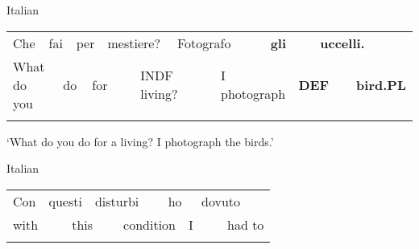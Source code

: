 \begin{listWWNumileveli}
\item 

\begin{styleExample}
Italian

\end{styleExample}

\end{listWWNumileveli}

\begin{tabular}{llllllllllllll}
\lsptoprule
Che & \multicolumn{2}{l}{fai

} & \multicolumn{2}{l}{per

} & \multicolumn{2}{l}{mestiere?

} & \multicolumn{2}{l}{Fotografo

} & \multicolumn{2}{l}{{\bfseries gli}

} & \multicolumn{2}{l}{{\bfseries uccelli.}

} & \\
\multicolumn{2}{l}{What do you

} & \multicolumn{2}{l}{do

} & \multicolumn{2}{l}{for

} & \multicolumn{2}{l}{INDF living?

} & \multicolumn{2}{l}{I photograph

} & \multicolumn{2}{l}{{\bfseries DEF}

} & \multicolumn{2}{l}{{\bfseries bird.PL}

}\\
\lspbottomrule
\end{tabular}

\begin{styleTranslation}
‘What do you do for a living? I photograph the birds.’

\end{styleTranslation}

\begin{listWWNumileveli}
\item 

\begin{styleExample}
Italian

\end{styleExample}

\end{listWWNumileveli}

\begin{tabular}{llllllllll}
\lsptoprule
Con & \multicolumn{2}{l}{questi

} & \multicolumn{2}{l}{disturbi

} & \multicolumn{2}{l}{ho

} & \multicolumn{2}{l}{dovuto

} & \\
\multicolumn{2}{l}{with

} & \multicolumn{2}{l}{this

} & \multicolumn{2}{l}{condition

} & \multicolumn{2}{l}{I

} & \multicolumn{2}{l}{had to

}\\
\lspbottomrule
\end{tabular}

